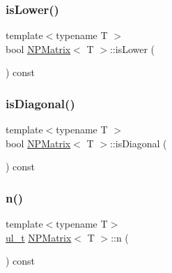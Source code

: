 \mbox{\label{class_n_p_matrix_a6844661ffc6253ad10c104e0069a0a09}} 
\subsubsection{\texorpdfstring{isLower()}{isLower()}}
{\footnotesize\ttfamily template$<$typename T $>$ \\
bool \mbox{\hyperlink{class_n_p_matrix}{N\+P\+Matrix}}$<$ T $>$\+::is\+Lower (\begin{DoxyParamCaption}{ }\end{DoxyParamCaption}) const}

\mbox{\label{class_n_p_matrix_aa6e1114bee7818455ee8c2e8bcd55679}} 
\subsubsection{\texorpdfstring{isDiagonal()}{isDiagonal()}}
{\footnotesize\ttfamily template$<$typename T $>$ \\
bool \mbox{\hyperlink{class_n_p_matrix}{N\+P\+Matrix}}$<$ T $>$\+::is\+Diagonal (\begin{DoxyParamCaption}{ }\end{DoxyParamCaption}) const}

\mbox{\label{class_n_p_matrix_afc181b7652d9427125c72c38d7c1498d}} 
\subsubsection{\texorpdfstring{n()}{n()}}
{\footnotesize\ttfamily template$<$typename T$>$ \\
\mbox{\hyperlink{typedef_8h_a1b140a2034db3f5dfe18a987745df43a}{ul\+\_\+t}} \mbox{\hyperlink{class_n_p_matrix}{N\+P\+Matrix}}$<$ T $>$\+::n (\begin{DoxyParamCaption}{ }\end{DoxyParamCaption}) const\hspace{0.3cm}{\ttfamily [inline]}}



